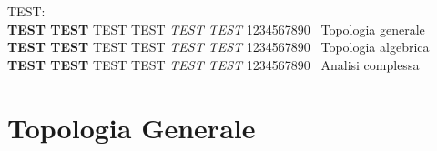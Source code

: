 \documentclass[a4paper, twoside]{book}
\begin{document}

\setcounter{page}{1} %




TEST:
\\
\textcolor{TopGener}{\textbf{TEST TEST} TEST TEST \textit{TEST TEST} 1234567890} \ Topologia generale\\
\textcolor{TopAlg}{\textbf{TEST TEST} TEST TEST \textit{TEST TEST} 1234567890} \ Topologia algebrica\\
\textcolor{AnComp}{\textbf{TEST TEST} TEST TEST \textit{TEST TEST} 1234567890} \ Analisi complessa




\frontmatter



\setcounter{page}{1}

\tableofcontents







\mainmatter		%


\part{Topologia Generale}



\end{document}
